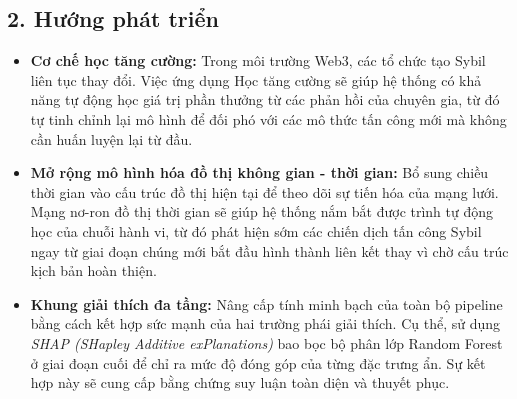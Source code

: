 \subsection{2. Hướng phát triển}

\begin{itemize}[label={--}, itemsep=1pt]
    \item \textbf{Cơ chế học tăng cường:} Trong môi trường Web3, các tổ chức tạo Sybil liên tục thay đổi. Việc ứng dụng Học tăng cường sẽ giúp hệ thống có khả năng tự động học giá trị phần thưởng từ các phản hồi của chuyên gia, từ đó tự tinh chỉnh lại mô hình để đối phó với các mô thức tấn công mới mà không cần huấn luyện lại từ đầu.
    
    \item \textbf{Mở rộng mô hình hóa đồ thị không gian - thời gian:} Bổ sung chiều thời gian vào cấu trúc đồ thị hiện tại để theo dõi sự tiến hóa của mạng lưới. Mạng nơ-ron đồ thị thời gian sẽ giúp hệ thống nắm bắt được trình tự động học của chuỗi hành vi, từ đó phát hiện sớm các chiến dịch tấn công Sybil ngay từ giai đoạn chúng mới bắt đầu hình thành liên kết thay vì chờ cấu trúc kịch bản hoàn thiện.
    
    \item \textbf{Khung giải thích đa tầng:} Nâng cấp tính minh bạch của toàn bộ pipeline bằng cách kết hợp sức mạnh của hai trường phái giải thích. Cụ thể, sử dụng \textit{SHAP (SHapley Additive exPlanations)} bao bọc bộ phân lớp Random Forest ở giai đoạn cuối để chỉ ra mức độ đóng góp của từng đặc trưng ẩn. Sự kết hợp này sẽ cung cấp bằng chứng suy luận toàn diện và thuyết phục.
\end{itemize}